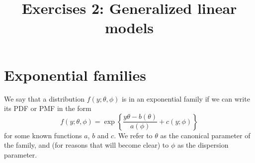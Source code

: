 \documentclass[11pt]{article}
\title{Exercises 2: Generalized linear models}
\date{}  %
\begin{document}
\maketitle%

\section{Exponential families}

We say that a distribution $f(y; \theta, \phi)$ is in an exponential family if we can write its PDF or PMF in the form
$$
f(y; \theta, \phi) = \exp \left\{ \frac{y \theta - b(\theta)}{a(\phi)} + c(y; \phi)   \right \}
$$
for some known functions $a$, $b$ and $c$.  We refer to $\theta$ as the canonical parameter of the family, and  (for reasons that will become clear) to $\phi$ as the dispersion parameter.  
\end{document}
